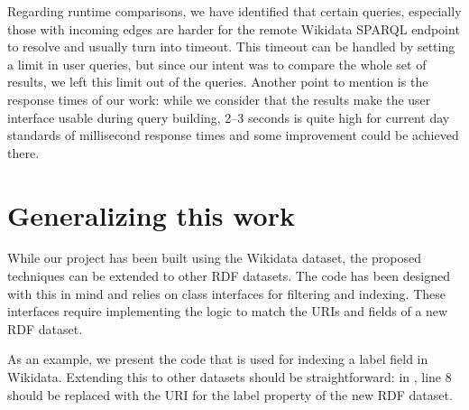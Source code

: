 Regarding runtime comparisons, we have identified that certain queries, especially those with incoming edges are harder for the remote Wikidata SPARQL endpoint to resolve and usually turn into timeout. This timeout can be handled by setting a limit in user queries, but since our intent was to compare the whole set of results, we left this limit out of the queries. Another point to mention is the response times of our work: while we consider that the results make the user interface usable during query building, 2--3 seconds is quite high for current day standards of millisecond response times and some improvement could be achieved there.


\section{Generalizing this work}
\label{chap:extendingRDF}

While our project has been built using the Wikidata dataset, the proposed techniques can be extended to other RDF datasets. The code has been designed with this in mind and relies on class interfaces for filtering and indexing. These interfaces require implementing the logic to match the URIs and fields of a new RDF dataset.

As an example, we present the code that is used for indexing a label field in Wikidata. Extending this to other datasets should be straightforward: in , line 8 should be replaced with the URI for the label property of the new RDF dataset.

